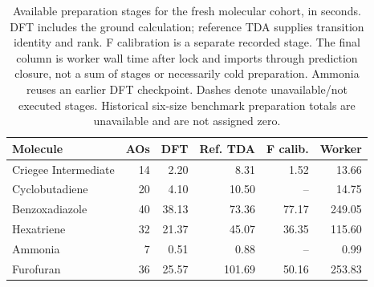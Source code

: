 \begin{table}[!htbp]
\centering\small
\caption{Available preparation stages for the fresh molecular cohort, in seconds. DFT includes the ground calculation; reference TDA supplies transition identity and rank. F calibration is a separate recorded stage. The final column is worker wall time after lock and imports through prediction closure, not a sum of stages or necessarily cold preparation. Ammonia reuses an earlier DFT checkpoint. Dashes denote unavailable/not executed stages. Historical six-size benchmark preparation totals are unavailable and are not assigned zero.}\label{tab:finalprep}
\begin{tabular}{lrrrrr}
\toprule
Molecule & AOs & DFT & Ref. TDA & F calib. & Worker \\
\midrule
Criegee Intermediate & 14 & 2.20 & 8.31 & 1.52 & 13.66 \\
Cyclobutadiene & 20 & 4.10 & 10.50 & -- & 14.75 \\
Benzoxadiazole & 40 & 38.13 & 73.36 & 77.17 & 249.05 \\
Hexatriene & 32 & 21.37 & 45.07 & 36.35 & 115.60 \\
Ammonia & 7 & 0.51 & 0.88 & -- & 0.99 \\
Furofuran & 36 & 25.57 & 101.69 & 50.16 & 253.83 \\
\bottomrule
\end{tabular}
\end{table}
